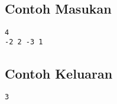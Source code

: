 \documentclass{article}
\begin{document}
\\
\begin{multicols}{2}
\subsection*{Contoh Masukan}
\begin{lstlisting}
4
-2 2 -3 1
\end{lstlisting}
\columnbreak
\subsection*{Contoh Keluaran}
\begin{lstlisting}
3
\end{lstlisting}
\vfill
\null
\end{multicols}


\pagebreak
\end{document}
